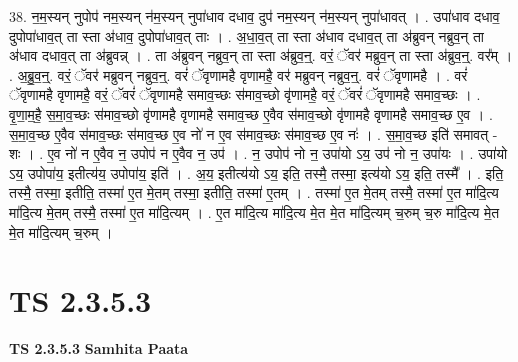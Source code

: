 \documentclass[17pt]{extarticle}
\begin{document}
38. न॒म॒स्यन् नुपोप॑ नम॒स्यन् न॑म॒स्यन् नुपा॑धाव दधाव॒ दुप॑ नम॒स्यन् न॑म॒स्यन् नुपा॑धावत् । . उपा॑धाव दधाव॒ दुपोपा॑धाव॒त् ता स्ता अ॑धाव॒ दुपोपा॑धाव॒त् ताः । . अ॒धा॒व॒त् ता स्ता अ॑धाव दधाव॒त् ता अ॑ब्रुवन् नब्रुव॒न् ता अ॑धाव दधाव॒त् ता अ॑ब्रुवन्न् । . ता अ॑ब्रुवन् नब्रुव॒न् ता स्ता अ॑ब्रुव॒न्॒. वरं॒ ॅवर॑ मब्रुव॒न् ता स्ता अ॑ब्रुव॒न्॒. वर᳚म् । . अ॒ब्रु॒व॒न्॒. वरं॒ ॅवर॑ मब्रुवन् नब्रुव॒न्॒. वरं॑ ॅवृणामहै वृणामहै॒ वर॑ मब्रुवन् नब्रुव॒न्॒. वरं॑ ॅवृणामहै । . वरं॑ ॅवृणामहै वृणामहै॒ वरं॒ ॅवरं॑ ॅवृणामहै समाव॒च्छः स॑माव॒च्छो वृ॑णामहै॒ वरं॒ ॅवरं॑ ॅवृणामहै समाव॒च्छः । . वृ॒णा॒म॒है॒ स॒मा॒व॒च्छः स॑माव॒च्छो वृ॑णामहै वृणामहै समाव॒च्छ ए॒वैव स॑माव॒च्छो वृ॑णामहै वृणामहै समाव॒च्छ ए॒व । . स॒मा॒व॒च्छ ए॒वैव स॑माव॒च्छः स॑माव॒च्छ ए॒व नो॑ न ए॒व स॑माव॒च्छः स॑माव॒च्छ ए॒व नः॑ । . स॒मा॒व॒च्छ इति॑ समावत् - शः । . ए॒व नो॑ न ए॒वैव न॒ उपोप॑ न ए॒वैव न॒ उप॑ । . न॒ उपोप॑ नो न॒ उपा॑यो ऽय॒ उप॑ नो न॒ उपा॑यः । . उपा॑यो ऽय॒ उपोपा॑य॒ इतीत्य॑य॒ उपोपा॑य॒ इति॑ । . अ॒य॒ इतीत्य॑यो ऽय॒ इति॒ तस्मै॒ तस्मा॒ इत्य॑यो ऽय॒ इति॒ तस्मै᳚ । . इति॒ तस्मै॒ तस्मा॒ इतीति॒ तस्मा॑ ए॒त मे॒तम् तस्मा॒ इतीति॒ तस्मा॑ ए॒तम् । . तस्मा॑ ए॒त मे॒तम् तस्मै॒ तस्मा॑ ए॒त मा॑दि॒त्य मा॑दि॒त्य मे॒तम् तस्मै॒ तस्मा॑ ए॒त मा॑दि॒त्यम् । . ए॒त मा॑दि॒त्य मा॑दि॒त्य मे॒त मे॒त मा॑दि॒त्यम् च॒रुम् च॒रु मा॑दि॒त्य मे॒त मे॒त मा॑दि॒त्यम् च॒रुम् । \newline
\pagebreak
{}

\section{ TS 2.3.5.3 }

\textbf{TS 2.3.5.3 } \newline
\textbf{Samhita Paata} \newline
\end{document}
